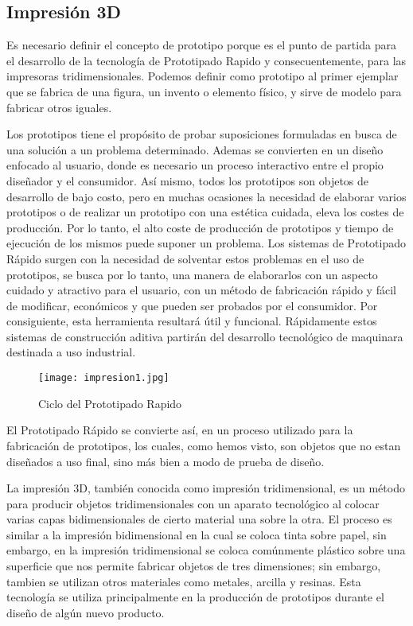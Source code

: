 \subsection{Impresión 3D}

\par
Es necesario definir el concepto de prototipo porque es el punto de partida para el desarrollo de la tecnología de Prototipado Rapido y consecuentemente, para las impresoras tridimensionales. Podemos definir como prototipo al primer ejemplar que se fabrica de una figura, un invento o elemento físico, y sirve de modelo para fabricar otros iguales.\cite{impresoras3d-valverde}

\par \noindent
Los prototipos tiene el propósito de probar suposiciones formuladas en busca de una solución a un problema determinado. Ademas se convierten en un diseño enfocado al usuario, donde es necesario un proceso interactivo entre el propio diseñador y el consumidor. Así mismo, todos los prototipos son objetos de desarrollo de bajo costo, pero en muchas ocasiones la necesidad de elaborar varios prototipos o de realizar un prototipo con una estética cuidada, eleva los costes de producción. Por lo tanto, el alto coste de producción de prototipos y tiempo de ejecución de los mismos puede suponer un problema. Los sistemas de Prototipado Rápido surgen con la necesidad de solventar estos problemas en el uso de prototipos, se busca por lo tanto, una manera de elaborarlos con un aspecto cuidado y atractivo para el usuario, con un método de fabricación rápido y fácil de modificar, económicos y que pueden ser probados por el consumidor. Por consiguiente, esta herramienta resultará útil y funcional. Rápidamente estos sistemas de construcción aditiva partirán del desarrollo tecnológico de maquinara destinada a uso industrial\cite{impresoras3d-valverde}. 

\begin{figure}[H]
	\centering
	\texttt{[image: impresion1.jpg]}
	\caption{Ciclo del Prototipado Rapido}
\end{figure}

\par \noindent
El Prototipado Rápido se convierte así, en un proceso utilizado para la fabricación de prototipos, los cuales, como hemos visto, son objetos que no estan diseñados a uso final, sino más bien a modo de prueba de diseño\cite{impresoras3d-valverde}.

\par \noindent
La impresión 3D, también conocida como impresión tridimensional, es un método para
producir objetos tridimensionales con un aparato tecnológico al colocar varias capas
bidimensionales de cierto material una sobre la otra. El proceso es similar a la impresión
bidimensional en la cual se coloca tinta sobre papel, sin embargo, en la impresión
tridimensional se coloca comúnmente plástico sobre una superficie que nos permite fabricar objetos de tres
dimensiones; sin embargo, tambien se utilizan otros materiales como metales, arcilla y resinas. Esta tecnología se utiliza principalmente en la producción de prototipos durante
el diseño de algún nuevo producto.\cite{impresoras3d-monterrey}

